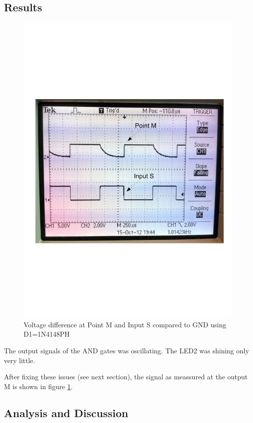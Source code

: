 \documentclass[journal]{IEEEtran}
\begin{document}
\subsection{Results} 

\begin{figure}
  \centering
   \includegraphics[trim=15mm 75mm 10mm 80mm, clip,
   width=\columnwidth]{img/shift_volt1.pdf}
   \caption{Voltage difference at Point M and Input S compared to GND using
   D1=1N4148PH}
   \label{fig:signal_m1}
\end{figure}

The output signals of the AND gates was oscillating. The LED2 was
shining only very little.

After fixing these issues (see next section), the signal as meassured at the
output M is shown in figure \ref{fig:signal_m1}.

\subsection{Analysis and Discussion}
\end{document}
